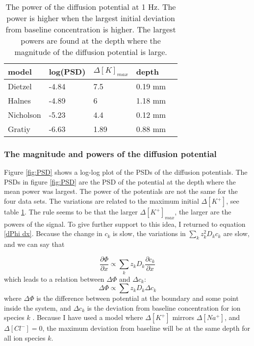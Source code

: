 \documentclass{article}
\begin{document}
\begin{table}[h!]
  \centering
  \caption{The power of the diffusion potential at 1 Hz. The power is higher when the largest initial deviation from baseline concentration is higher. The largest powers are found at the depth where the magnitude of the diffusion potential is large.}
  \label{tab:psd_magnitude}
  \begin{tabular}{l||l|l|l|l}
model & log(PSD) & $\Delta [K]_{max}$ & depth \\
\hline
Dietzel & -4.84 & 7.5 & 0.19 mm \\
Halnes & -4.89 & 6  & 1.18 mm\\
Nicholson & -5.23 & 4.4 & 0.12 mm \\
Gratiy &-6.63 & 1.89 & 0.88 mm \\



 \end{tabular}
\end{table}



\subsubsection{The magnitude and powers of the diffusion potential}
Figure \ref{fig:PSD} shows a log-log plot of the PSDs of the diffusion potentials. The PSDs in figure \ref{fig:PSD} are the PSD of the potential at the depth where the mean power was largest. The power of the potentials are not the same for the four data sets. The variations are related to the maximum initial $\Delta [K^+]$, see table \ref{tab:psd_magnitude}. The rule seems to be that the larger $\Delta [K^+]_{max}$, the larger are the powers of the signal.  To give further support to this idea, I returned to equation \ref{dPhi dx}. Because the change in $c_k$ is slow, the variations in $\sum_k z_k^2 D_k c_k$ are slow, and we can say that 

\begin{equation}
 \frac{\partial \Phi}{\partial x}  \propto { \sum_k z_k D_k \frac{\partial c_k}{\partial x} }
\end{equation}
which leads to a relation between $\Delta \Phi$ and $\Delta c_k$:
\begin{equation}\label{delta phi}
 \Delta \Phi \propto \sum z_k D_k \Delta c_k
\end{equation}
where $\Delta \Phi $ is the difference between potential at the boundary and some point inside the system, and $\Delta c_k $ is the deviation from baseline concentration for ion species $k$ . Because I have used a model where $\Delta [K^+]$ mirrors $\Delta [Na^+]$, and $\Delta [Cl^-] =0$, the maximum deviation from baseline will be at the same depth for all ion species $k$. 
\end{document}
